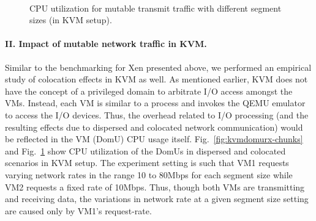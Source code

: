 \begin{figure}[t]%
	\centering
	 ~~
	\caption{CPU utilization for mutable transmit traffic with different segment sizes (in KVM setup).}
	\label{fig:kvmdomutx-chunks}
\end{figure}

\paragraph{II. Impact of mutable network traffic in KVM.}
\label{sec:2ndchap-kvm-benchmark}
Similar to the benchmarking for Xen presented above, we performed
an empirical study of colocation effects in KVM as well.
As mentioned earlier, KVM does not have the concept of a privileged
domain to arbitrate I/O access amongst the VMs. Instead, each VM
is similar to a process and invokes the QEMU emulator to
access the
I/O devices. Thus, the overhead related to I/O processing (and the
resulting effects due to dispersed and colocated network
communication) would be reflected in the VM (DomU) CPU usage itself.
Fig.~\ref{fig:kvmdomurx-chunks} and Fig.~\ref{fig:kvmdomutx-chunks}
show CPU utilization
of the DomUs in dispersed and colocated scenarios in KVM
setup. The experiment setting is such that VM1 requests varying
network rates in the range 10 to 80Mbps for
each segment size while VM2 requests a fixed rate of 10Mbps.
Thus, though both VMs are transmitting and
receiving data, the variations in network rate at a given
segment size setting are caused only by VM1's request-rate.

